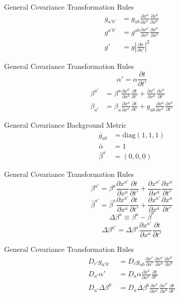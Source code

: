 \documentclass[xcolor=dvipsnames]{beamer}
\begin{document}
	\begin{frame}{General Covariance}
		Transformation Rules
		\begin{align*}
		g_{a'b'} & = g_{ab}\frac{\partial x^{a}}{\partial x^{a'}}\frac{\partial x^{b}}{\partial x^{b'}}\\
		g^{a'b'} & = g^{ab}\frac{\partial x^{a'}}{\partial x^{a}}\frac{\partial x^{b'}}{\partial x^{b}}\\
		g' & = g\left|\frac{\partial x}{\partial x'}\right|^{2}
	\end{align*}
	\end{frame}
	\begin{frame}{General Covariance}
		Transformation Rules
			\[
				\alpha' = \alpha \frac{\partial t}{\partial t'}
			\]
			\pause
			\begin{align*}
				\beta^{a'} &= \beta^{a}\frac{\partial x^{a'}}{\partial x^{a}}\frac{\partial t}{\partial t'} + \frac{\partial x^{a'}}{\partial x^{a}}\frac{\partial x^{a}}{\partial t'}\\
				\beta_{a'} &= \beta_{a}\frac{\partial x^{a}}{\partial x^{a'}}\frac{\partial t}{\partial t'} + g_{ab}\frac{\partial x^{a}}{\partial x^{a'}}\frac{\partial x^{b}}{\partial t'}				
			\end{align*}
	\end{frame}
	\begin{frame}{General Covariance}
		Background Metric
		\pause
		\begin{align*}
		{\bar g}_{ab} &= \text{diag}(1, 1, 1)\\
		{\bar \alpha} &= 1\\
		{\bar \beta}^{a} &= (0, 0, 0)
		\end{align*}
	\end{frame}
	\begin{frame}{General Covariance}
		Transformation Rules
		\[
		\beta^{a'} = \beta^{a}\frac{\partial x^{a'}}{\partial x^{a}}\frac{\partial t}{\partial t'} + \frac{\partial x^{a'}}{\partial x^{a}}\frac{\partial x^{a}}{\partial t'}
		\]
		\pause
		\[
		{\bar \beta}^{a'} = {\bar \beta}^{a}\frac{\partial x^{a'}}{\partial x^{a}}\frac{\partial t}{\partial t'} + \frac{\partial x^{a'}}{\partial x^{a}}\frac{\partial x^{a}}{\partial t'}
		\]
		\pause
		\[
		\Delta \beta^{a} \equiv \beta^{a} - {\bar \beta}^{a}
		\]
		\pause
		\[
		\Delta \beta^{a'} = \Delta\beta^{a}\frac{\partial x^{a'}}{\partial x^{a}}\frac{\partial t}{\partial t'}
		\]
	\end{frame}
	\begin{frame}{General Covariance}
		Transformation Rules
		\begin{align*}
			D_{c'}g_{a'b'} &= D_{c}g_{ab}\frac{\partial x^{c'}}{\partial x^{c}}\frac{\partial x^{a'}}{\partial x^{a}}\frac{\partial x^{b'}}{\partial x^{b}}\\
		D_{a'}\alpha' &= D_{a}\alpha\frac{\partial x^{a}}{\partial x^{a'}}\frac{\partial t}{\partial t'}\\
		D_{a'}\Delta\beta^{b'} &= D_{a}\Delta\beta^{b}\frac{\partial x^{a}}{\partial x^{a'}}\frac{\partial x^{b'}}{\partial x^{b}}\frac{\partial t}{\partial t'}	
		\end{align*}
	\end{frame}
\end{document}

